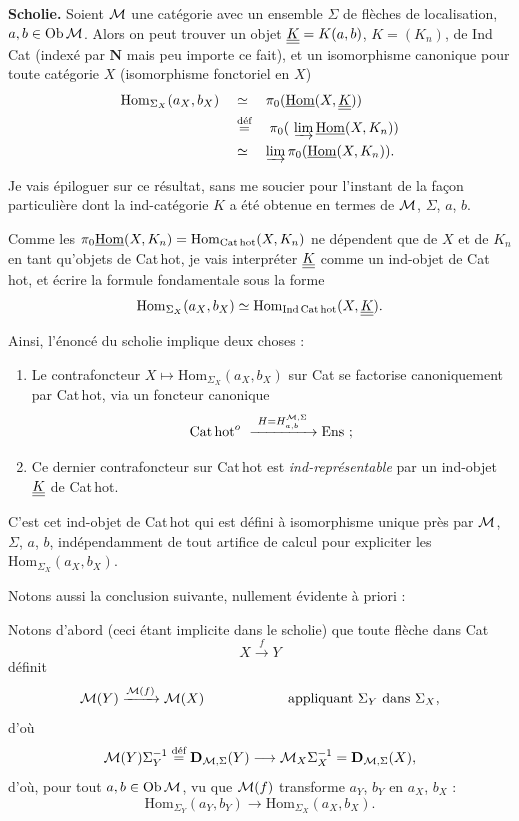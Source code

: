 \textbf{Scholie.} Soient $\cM$ une catégorie avec un ensemble $\Sigma$ de flèches de localisation, $a,b\in\mathrm{Ob}\,\cM$. Alors on peut trouver un objet $\KK=K(a,b)$, $K=(K_n)$, de Ind\,Cat (indexé par $\mathbf{N}$ mais peu importe ce fait), et un isomorphisme canonique pour toute catégorie $X$ (isomorphisme fonctoriel en $X$)
\[
\begin{aligned}
\mathrm{Hom}_{\Sigma_X}(a_X,b_X) \quad &\simeq \quad \pi_0(\uHom(X,\KK)) \\
&\dfeq \quad \pi_0(\ \varinjlim \uHom(X,K_n)) \\
&\simeq \quad \varinjlim \pi_0(\uHom(X,K_n)).
\end{aligned}
\]


Je vais épiloguer sur ce résultat, sans me soucier pour l'instant de la façon particulière dont la ind-catégorie $K$ a été obtenue en termes de $\cM$, $\Sigma$, $a$, $b$.

Comme les $\pi_0\uHom(X,K_n)=\mathrm{Hom}_{\Cathot}(X,K_n)$ ne dépendent que de $X$ et de $K_n$ en tant qu'objets de Cat\,hot, je vais interpréter $\KK$ comme un ind-objet de Cat\,hot, et écrire la formule fondamentale sous la forme
\[
\mathrm{Hom}_{\Sigma_X}(a_X,b_X)\simeq\mathrm{Hom}_{\mathrm{Ind\,Cat\,hot}}(X,\KK).
\]

Ainsi, l'énoncé du scholie implique deux choses :

\begin{enumerate}
\item[a)] Le contrafoncteur $X\longmapsto\mathrm{Hom}_{\Sigma_X}(a_X,b_X)$ sur Cat se factorise canoniquement par Cat\,hot, via un foncteur canonique
\[
\Cathot^{o}\ \xrightarrow{\ H=H^{\cM,\Sigma}_{a,b}\ }\mathrm{Ens}\ ;
\]
\item[b)] Ce dernier contrafoncteur sur Cat\,hot est \textit{ind-représentable} par un ind-objet $\KK$ de Cat\,hot.
\end{enumerate}

C'est cet ind-objet de Cat\,hot qui est défini à isomorphisme unique près par $\cM$, $\Sigma$, $a$, $b$, indépendamment de tout artifice de calcul pour expliciter les $\mathrm{Hom}_{\Sigma_X}(a_X,b_X)$.

Notons aussi la conclusion suivante, nullement évidente à priori :

Notons d'abord (ceci étant implicite dans le scholie) que toute flèche dans Cat
\[
X\xrightarrow{\ f\ }Y
\]
définit
\[
\cM(Y)\xrightarrow{\cM(f)}\cM(X) \qquad\qquad\qquad \text{appliquant } \Sigma_Y \text{ dans } \Sigma_X,
\]
d'où
\[
\cM(Y)\Sigma_Y^{-1}\dfeq\mathbf{D}_{\cM,\Sigma}(Y)\longrightarrow\cM_X\Sigma_X^{-1}=\mathbf{D}_{\cM,\Sigma}(X),
\]
 d'où, pour tout $a,b\in\mathrm{Ob}\,\cM$, vu que $\cM(f)$ transforme $a_Y$, $b_Y$ en $a_X$, $b_X$ :
\[
\boxed{\mathrm{Hom}_{\Sigma_Y}(a_Y,b_Y)\longrightarrow\mathrm{Hom}_{\Sigma_X}(a_X,b_X).}
\]

